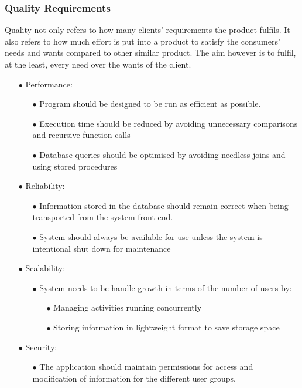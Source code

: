 \documentclass[a4paper,12pt]{article}
\begin{document}
\subsubsection{Quality Requirements}
Quality not only refers to how many clients’ requirements the product fulfils. It also refers to how much effort is put into a product to satisfy the consumers’ needs and wants compared to other similar product. The aim however is to fulfil, at the least, every need over the wants of the client.
 \begin{itemize}
 	\item[$\bullet$]Performance: 
	 \begin{itemize}
		 \item[$\bullet$]Program should be designed to be run as efficient as possible.
		 \item[$\bullet$]Execution time should be reduced by avoiding unnecessary comparisons and recursive function calls
		 \item[$\bullet$]Database queries should be optimised by avoiding needless joins and using stored procedures
	 \end{itemize}
 	\item[$\bullet$]Reliability:  
	 \begin{itemize}
	 	\item[$\bullet$]Information stored in the database should remain correct when being transported from the system front-end.
	 	\item[$\bullet$]System should always be available for use unless the system is intentional shut down  for maintenance
	 \end{itemize}
 	\item[$\bullet$]Scalability: 
 	 \begin{itemize}
 	 		\item[$\bullet$]System needs to be handle growth in terms of the number of users by: 
 		\begin{itemize}
 			\item[$\bullet$]Managing activities running concurrently
	 		\item[$\bullet$]Storing information in lightweight format to save storage space
		 \end{itemize}
	 \end{itemize}
 	\item[$\bullet$]Security:
 	\begin{itemize}
 		\item[$\bullet$]The application should maintain permissions for access and modification of information for the different user groups.

\end{itemize}
\end{itemize}
\end{document}
